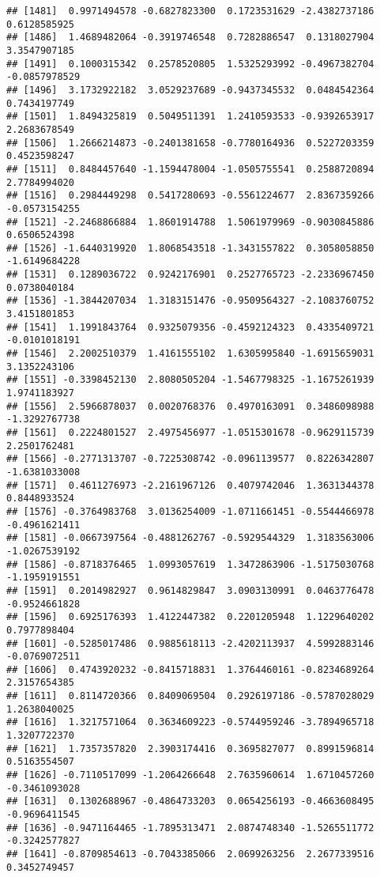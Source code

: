 \documentclass[
]{article}
\begin{document}
\begin{verbatim}
## [1481]  0.9971494578 -0.6827823300  0.1723531629 -2.4382737186  0.6128585925
## [1486]  1.4689482064 -0.3919746548  0.7282886547  0.1318027904  3.3547907185
## [1491]  0.1000315342  0.2578520805  1.5325293992 -0.4967382704 -0.0857978529
## [1496]  3.1732922182  3.0529237689 -0.9437345532  0.0484542364  0.7434197749
## [1501]  1.8494325819  0.5049511391  1.2410593533 -0.9392653917  2.2683678549
## [1506]  1.2666214873 -0.2401381658 -0.7780164936  0.5227203359  0.4523598247
## [1511]  0.8484457640 -1.1594478004 -1.0505755541  0.2588720894  2.7784994020
## [1516]  0.2984449298  0.5417280693 -0.5561224677  2.8367359266 -0.0573154255
## [1521] -2.2468866884  1.8601914788  1.5061979969 -0.9030845886  0.6506524398
## [1526] -1.6440319920  1.8068543518 -1.3431557822  0.3058058850 -1.6149684228
## [1531]  0.1289036722  0.9242176901  0.2527765723 -2.2336967450  0.0738040184
## [1536] -1.3844207034  1.3183151476 -0.9509564327 -2.1083760752  3.4151801853
## [1541]  1.1991843764  0.9325079356 -0.4592124323  0.4335409721 -0.0101018191
## [1546]  2.2002510379  1.4161555102  1.6305995840 -1.6915659031  3.1352243106
## [1551] -0.3398452130  2.8080505204 -1.5467798325 -1.1675261939  1.9741183927
## [1556]  2.5966878037  0.0020768376  0.4970163091  0.3486098988 -1.3292767738
## [1561]  0.2224801527  2.4975456977 -1.0515301678 -0.9629115739  2.2501762481
## [1566] -0.2771313707 -0.7225308742 -0.0961139577  0.8226342807 -1.6381033008
## [1571]  0.4611276973 -2.2161967126  0.4079742046  1.3631344378  0.8448933524
## [1576] -0.3764983768  3.0136254009 -1.0711661451 -0.5544466978 -0.4961621411
## [1581] -0.0667397564 -0.4881262767 -0.5929544329  1.3183563006 -1.0267539192
## [1586] -0.8718376465  1.0993057619  1.3472863906 -1.5175030768 -1.1959191551
## [1591]  0.2014982927  0.9614829847  3.0903130991  0.0463776478 -0.9524661828
## [1596]  0.6925176393  1.4122447382  0.2201205948  1.1229640202  0.7977898404
## [1601] -0.5285017486  0.9885618113 -2.4202113937  4.5992883146 -0.0769072511
## [1606]  0.4743920232 -0.8415718831  1.3764460161 -0.8234689264  2.3157654385
## [1611]  0.8114720366  0.8409069504  0.2926197186 -0.5787028029  1.2638040025
## [1616]  1.3217571064  0.3634609223 -0.5744959246 -3.7894965718  1.3207722370
## [1621]  1.7357357820  2.3903174416  0.3695827077  0.8991596814  0.5163554507
## [1626] -0.7110517099 -1.2064266648  2.7635960614  1.6710457260 -0.3461093028
## [1631]  0.1302688967 -0.4864733203  0.0654256193 -0.4663608495 -0.9696411545
## [1636] -0.9471164465 -1.7895313471  2.0874748340 -1.5265511772 -0.3242577827
## [1641] -0.8709854613 -0.7043385066  2.0699263256  2.2677339516  0.3452749457

\end{verbatim}
\end{document}

